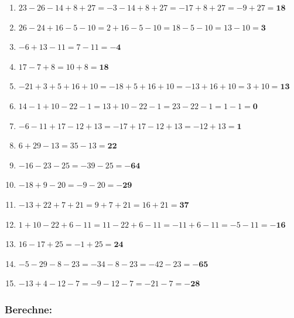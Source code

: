 \documentclass[a4paper,12pt]{article} %
\begin{document}
\begin{enumerate}
  \item \(23 - 26 - 14 + 8 + 27 = -3 - 14 + 8 + 27 = -17 + 8 + 27 = -9 + 27 = \mathbf{18}\) %

  \item \(26 - 24 + 16 - 5 - 10 = 2 + 16 - 5 - 10 = 18 - 5 - 10 = 13 - 10 = \mathbf{3}\) %

  \item \(-6 + 13 - 11 = 7 - 11 = \mathbf{-4}\) %

  \item \(17 - 7 + 8 = 10 + 8 = \mathbf{18}\) %

  \item \(-21 + 3 + 5 + 16 + 10 = -18 + 5 + 16 + 10 = -13 + 16 + 10 = 3 + 10 = \mathbf{13}\) %

  \item \(14 - 1 + 10 - 22 - 1 = 13 + 10 - 22 - 1 = 23 - 22 - 1 = 1 - 1 = \mathbf{0}\) %

  \item \(-6 - 11 + 17 - 12 + 13 = -17 + 17 - 12 + 13 = -12 + 13 = \mathbf{1}\) %

  \item \(6 + 29 - 13 = 35 - 13 = \mathbf{22}\) %

  \item \(-16 - 23 - 25 = -39 - 25 = \mathbf{-64}\) %

  \item \(-18 + 9 - 20 = -9 - 20 = \mathbf{-29}\) %

  \item \(-13 + 22 + 7 + 21 = 9 + 7 + 21 = 16 + 21 = \mathbf{37}\) %

  \item \(1 + 10 - 22 + 6 - 11 = 11 - 22 + 6 - 11 = -11 + 6 - 11 = -5 - 11 = \mathbf{-16}\) %

  \item \(16 - 17 + 25 = -1 + 25 = \mathbf{24}\) %

  \item \(-5 - 29 - 8 - 23 = -34 - 8 - 23 = -42 - 23 = \mathbf{-65}\) %

  \item \(-13 + 4 - 12 - 7 = -9 - 12 - 7 = -21 - 7 = \mathbf{-28}\) %

\end{enumerate}

\subsubsection{Berechne:} %
\end{document}
